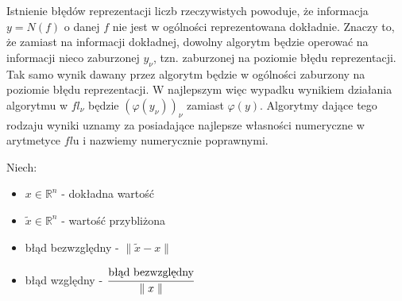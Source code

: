 \documentclass[hidelinks,a4paper,fleqn,oneside]{book}
\newcommand{\RR}{\mathbb{R}}
\begin{document}
Istnienie błędów reprezentacji liczb rzeczywistych powoduje, że informacja $y=N(f)$ o danej $f$ nie jest w ogólności reprezentowana dokładnie. Znaczy to, że zamiast na informacji dokładnej, dowolny algorytm będzie operować na informacji nieco zaburzonej $y_\nu$, tzn. zaburzonej na poziomie błędu reprezentacji. Tak samo wynik dawany przez algorytm będzie w ogólności zaburzony na poziomie błędu reprezentacji. W najlepszym więc wypadku wynikiem działania algorytmu w $fl_\nu$ będzie $(\varphi(y_\nu))_\nu$ zamiast $\varphi(y)$. Algorytmy dające tego rodzaju wyniki uznamy za posiadające najlepsze własności numeryczne w arytmetyce $fl$u i nazwiemy numerycznie poprawnymi.

Niech:
\begin{itemize}
    \item $x \in \RR^n$ - dokładna wartość
    \item $\tilde{x} \in \RR^n$ - wartość przybliżona
    \item błąd bezwzględny - $\parallel \tilde{x} - x \parallel$
    \item błąd względny - $\cfrac{\textrm{błąd bezwzględny}}{\parallel x \parallel}$
\end{itemize}
{\centering {}\par}

{\centering {}\par}
\end{document}
